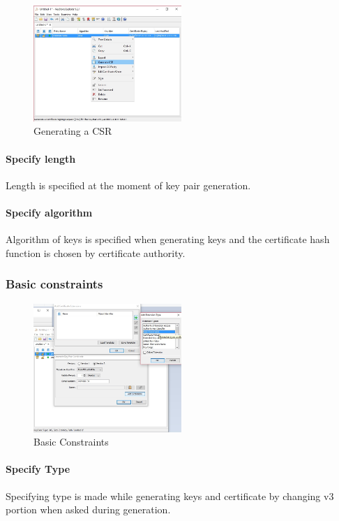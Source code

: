 \documentclass[10pt, a4paper]{report}
\begin{document}
{\begin{figure}[!ht]
 \caption{Generating a CSR}
 \centering
  \includegraphics[width=0.5\textwidth]{../Dependancies/Keystore_Explorer/genCSR.jpg}
\end{figure}

      \paragraph{Specify length}
Length is specified at the moment of key pair generation.

      \paragraph{Specify algorithm}
Algorithm of keys is specified when generating keys and the certificate hash function is chosen by certificate authority.

    \subsubsection{Basic constraints}

\begin{figure}[!ht]
 \caption{Basic Constraints}
 \centering
  \includegraphics[width=0.5\textwidth]{../Dependancies/Keystore_Explorer/Basic_Constraints.jpg}
\end{figure}

      \paragraph{Specify Type}
Specifying type is made while generating keys and certificate by changing v3 portion when asked during generation.

}
\end{document}
